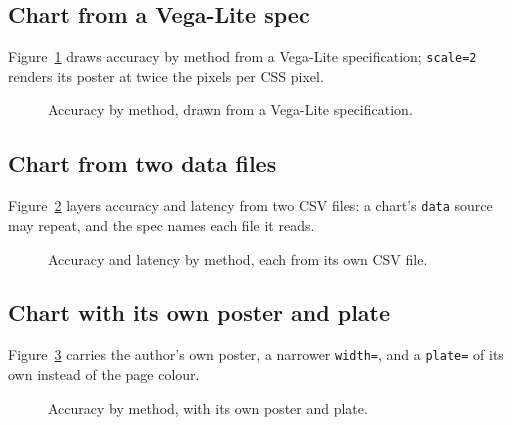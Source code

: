 \documentclass{article}
\theoremstyle{definition}
\begin{document}
\subsection{Chart from a Vega-Lite spec}
Figure~\ref{fig:chart} draws accuracy by method from a Vega-Lite
specification; \texttt{scale=2} renders its poster at twice the pixels per
CSS pixel.
\begin{figure}[ht]
\centering
\caption{Accuracy by method, drawn from a Vega-Lite specification.}
\label{fig:chart}
\end{figure}

\subsection{Chart from two data files}
Figure~\ref{fig:chart-split} layers accuracy and latency from two CSV files:
a chart's \texttt{data} source may repeat, and the spec names each file it
reads.
\begin{figure}[ht]
\centering
\caption{Accuracy and latency by method, each from its own CSV file.}
\label{fig:chart-split}
\end{figure}

\subsection{Chart with its own poster and plate}
Figure~\ref{fig:chart-styled} carries the author's own poster, a narrower
\texttt{width=}, and a \texttt{plate=} of its own instead of the page
colour.
\begin{figure}[ht]
\centering
\caption{Accuracy by method, with its own poster and plate.}
\label{fig:chart-styled}
\end{figure}
\end{document}
